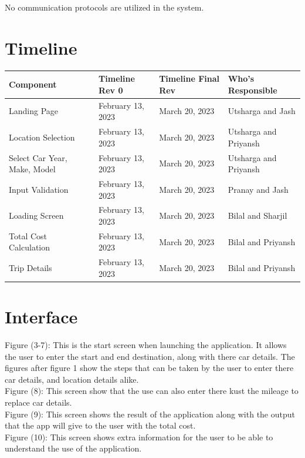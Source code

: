 \documentclass[12pt, titlepage]{article}
\begin{document}
No communication protocols are utilized in the system.

\section{Timeline}

\begin{table}[H]
	\begin{tabular}{|l|l|l|l|}
		\hline
		Component & Timeline Rev 0   & Timeline Final Rev & Who's Responsible \\ \hline
		Landing Page & February 13, 2023 & March 20, 2023     & Utsharga and Jash \\ \hline
		Location Selection & February 13, 2023 & March 20, 2023     & Utsharga and Priyansh \\ \hline
		Select Car Year, Make, Model & February 13, 2023 & March 20, 2023     & Utsharga and Priyansh \\ \hline
		Input Validation & February 13, 2023 & March 20, 2023     & Pranay and Jash \\ \hline
		Loading Screen & February 13, 2023 & March 20, 2023     & Bilal and Sharjil \\ \hline
		Total Cost Calculation & February 13, 2023 & March 20, 2023     & Bilal and Priyansh \\ \hline
		Trip Details & February 13, 2023 & March 20, 2023     & Bilal and Priyansh \\ \hline
	\end{tabular}
\end{table}

% 

\newpage{}

\appendix

\section{Interface}

Figure (3-7): This is the start screen when launching the application. It allows the user to enter the start and end destination, along with there car details. The figures after figure 1 show the steps that can be taken by the user to enter there car details, and location details alike.\\
Figure (8): This screen show that the use can also enter there kust the mileage to replace car details.\\
Figure (9): This screen shows the result of the application along with the output that the app will give to the user with the total cost.\\
Figure (10): This screen shows extra information for the user to be able to understand the use of the application.\\
\end{document}
